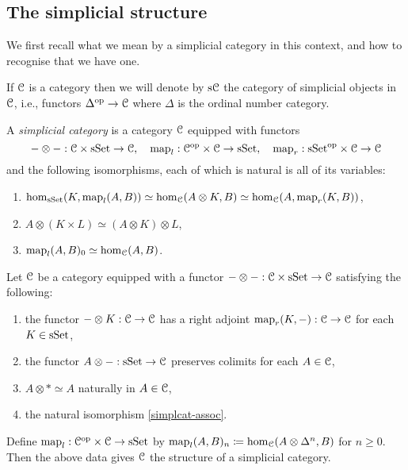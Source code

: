 \subsection{The simplicial structure}

We first recall what we mean by a simplicial category in this context,
and how to recognise that we have one.

\begin{notation}
  If $\mathcal{C}$ is a category then we will denote by $\mathrm{s}\mathcal{C}$ the category of
  simplicial objects in $\mathcal{C}$, i.e., functors $\Delta^{\mathrm{op}} \to \mathcal{C}$ where
  $\Delta$ is the ordinal number category.
\end{notation}

\begin{definition}
  \label{simplcat}
  A \emph{simplicial category} is a category $\mathcal{C}$ equipped with
  functors
  \[
  -\otimes- : \mathcal{C} \times \mathrm{s}\mathrm{Set} \to \mathcal{C}, \quad \operatorname{map}_l : \mathcal{C}^{\mathrm{op}} \times \mathcal{C}
  \to \mathrm{s}\mathrm{Set}, \quad \operatorname{map}_r : \mathrm{s}\mathrm{Set}^{\mathrm{op}} \times \mathcal{C} \to \mathcal{C}
  \]
  and the following isomorphisms, each of which is natural is all of
  its variables:
  \begin{enumerate}
  \item \label{simplcat-twovaradj} $\operatorname{hom}_{\mathrm{s}\mathrm{Set}}(K, \operatorname{map}_l(A,B)) \simeq
    \operatorname{hom}_{\mathcal{C}}(A \otimes K, B) \simeq \operatorname{hom}_{\mathcal{C}}(A, \operatorname{map}_r(K,B))$,
  \item \label{simplcat-assoc} $A \otimes (K \times L) \simeq (A
    \otimes K) \otimes L$,
  \item \label{simplcat-agree} $\operatorname{map}_l(A,B)_0 \simeq \operatorname{hom}_{\mathcal{C}}(A,B)$.
  \end{enumerate}
\end{definition}

\begin{lemma}
  Let $\mathcal{C}$ be a category equipped with a functor $-\otimes- : \mathcal{C}
  \times \mathrm{s}\mathrm{Set} \to \mathcal{C}$ satisfying the following:
  \begin{enumerate}
  \item the functor $- \otimes K : \mathcal{C} \to \mathcal{C}$ has a right adjoint
    $\operatorname{map}_r(K,-) : \mathcal{C} \to \mathcal{C}$ for each $K \in \mathrm{s}\mathrm{Set}$,
  \item the functor $A \otimes - : \mathrm{s}\mathrm{Set} \to \mathcal{C}$ preserves colimits
    for each $A \in \mathcal{C}$,
  \item $A \otimes * \simeq A$ naturally in $A \in \mathcal{C}$,
  \item the natural isomorphism \ref{simplcat-assoc}.
  \end{enumerate}
  Define $\operatorname{map}_l : \mathcal{C}^{\mathrm{op}} \times \mathcal{C} \to \mathrm{s}\mathrm{Set}$ by $\operatorname{map}_l(A,B)_n
  \coloneqq \operatorname{hom}_{\mathcal{C}}(A \otimes \Delta^n, B)$ for $n \ge 0$. Then the
  above data gives $\mathcal{C}$ the structure of a simplicial category.
\end{lemma}

